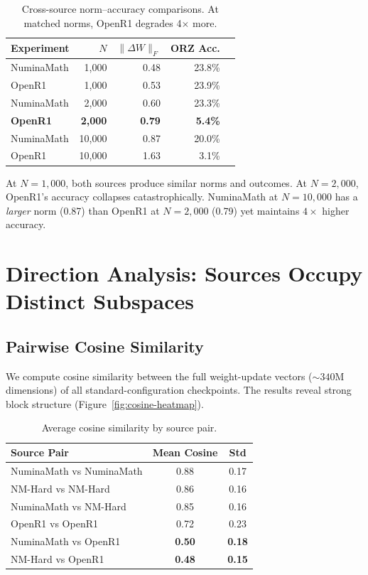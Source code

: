 \documentclass{article}
\begin{document}
\begin{table}[h]
\centering
\caption{Cross-source norm--accuracy comparisons. At matched norms, OpenR1 degrades 4$\times$ more.}
\label{tab:cross-source}
\small
\begin{tabular}{@{}lrrrr@{}}
\toprule
Experiment & $N$ & $\|\Delta W\|_F$ & ORZ Acc. \\
\midrule
NuminaMath & 1,000 & 0.48 & 23.8\% \\
OpenR1 & 1,000 & 0.53 & 23.9\% \\
\midrule
NuminaMath & 2,000 & 0.60 & 23.3\% \\
\textbf{OpenR1} & \textbf{2,000} & \textbf{0.79} & \textbf{5.4\%} \\
\midrule
NuminaMath & 10,000 & 0.87 & 20.0\% \\
OpenR1 & 10,000 & 1.63 & 3.1\% \\
\bottomrule
\end{tabular}
\end{table}

At $N{=}1{,}000$, both sources produce similar norms and outcomes. At $N{=}2{,}000$, OpenR1's accuracy collapses catastrophically. NuminaMath at $N{=}10{,}000$ has a \emph{larger} norm (0.87) than OpenR1 at $N{=}2{,}000$ (0.79) yet maintains $4{\times}$ higher accuracy.

\section{Direction Analysis: Sources Occupy Distinct Subspaces}
\label{sec:direction}

\subsection{Pairwise Cosine Similarity}

We compute cosine similarity between the full weight-update vectors (${\sim}340$M dimensions) of all standard-configuration checkpoints. The results reveal strong block structure (Figure~\ref{fig:cosine-heatmap}).

\begin{table}[h]
\centering
\caption{Average cosine similarity by source pair.}
\label{tab:cosine}
\small
\begin{tabular}{@{}lcc@{}}
\toprule
Source Pair & Mean Cosine & Std \\
\midrule
NuminaMath vs NuminaMath & 0.88 & 0.17 \\
NM-Hard vs NM-Hard & 0.86 & 0.16 \\
NuminaMath vs NM-Hard & 0.85 & 0.16 \\
OpenR1 vs OpenR1 & 0.72 & 0.23 \\
NuminaMath vs OpenR1 & \textbf{0.50} & \textbf{0.18} \\
NM-Hard vs OpenR1 & \textbf{0.48} & \textbf{0.15} \\
\bottomrule
\end{tabular}
\end{table}
\end{document}
